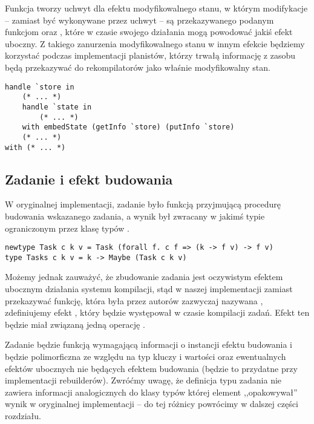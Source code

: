 

Funkcja  tworzy uchwyt dla efektu modyfikowalnego stanu, w którym modifykacje -- zamiast być wykonywane przez uchwyt -- są przekazywanego podanym funkcjom  oraz , które w czasie swojego działania mogą powodować jakiś efekt uboczny. Z takiego zanurzenia modyfikowalnego stanu w innym efekcie będziemy korzystać podczas implementacji planistów, którzy trwałą informację z zasobu będą przekazywać do rekompilatorów jako właśnie modyfikowalny stan.

\begin{lstlisting}[language=Haleff, float=h, caption={Wykorzystanie \helinl{embedState}}]
handle `store in
    (* ... *)
    handle `state in
        (* ... *)
    with embedState (getInfo `store) (putInfo `store)
    (* ... *)
with (* ... *)
\end{lstlisting}

\subsection{Zadanie i efekt budowania}

W oryginalnej implementacji, zadanie było funkcją przyjmującą procedurę budowania wskazanego zadania, a wynik był zwracany w jakimś typie  ograniczonym przez klasę typów .

\begin{lstlisting}[style=haskell-style]
newtype Task c k v = Task (forall f. c f => (k -> f v) -> f v)
type Tasks c k v = k -> Maybe (Task c k v)
\end{lstlisting}

Możemy jednak zauważyć, że zbudowanie zadania jest oczywistym efektem ubocznym działania systemu kompilacji, stąd w naszej implementacji zamiast przekazywać funkcję, która była przez autorów zazwyczaj nazywana , zdefiniujemy efekt , który będzie występował w czasie kompilacji zadań. Efekt ten będzie miał związaną jedną operację .



Zadanie będzie funkcją wymagającą informacji o instancji efektu budowania i będzie polimorficzna ze względu na typ kluczy i wartości oraz ewentualnych efektów ubocznych nie będących efektem budowania (będzie to przydatne przy implementacji rebuilderów). Zwróćmy uwagę, że definicja typu zadania nie zawiera informacji analogicznych do klasy typów  której element  ,,opakowywał'' wynik w oryginalnej implementacji -- do tej różnicy powrócimy w dalszej części rozdziału.

